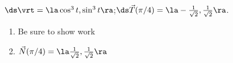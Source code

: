 {$\ds \vrt = \la \cos^3 t,\sin^3 t\ra$;\quad $\ds \vec T(\pi/4) = \la -\frac1{\sqrt{2}}, \frac1{\sqrt{2}}\ra$.
}
{\begin{enumerate}
	\item Be sure to show work
	\item	$\vec N(\pi/4) = \la \frac1{\sqrt{2}}, \frac1{\sqrt{2}}\ra$
\end{enumerate}
}